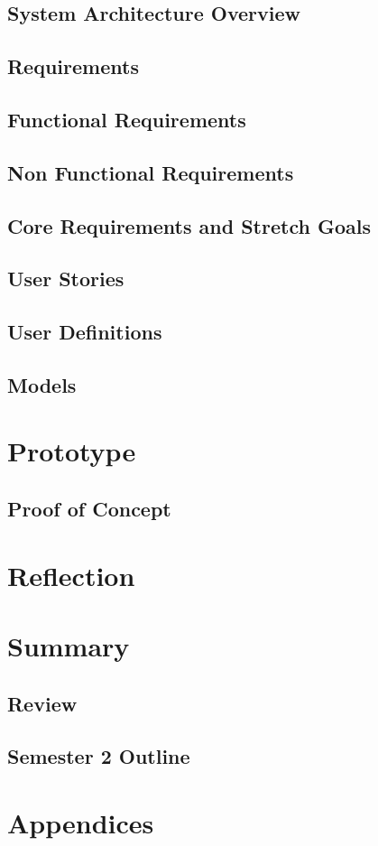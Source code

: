 \documentclass{article}
\begin{document}
\subsection{System Architecture Overview}
\subsection{Requirements}
\subsection{Functional Requirements}
\subsection{Non Functional Requirements}
\subsection{Core Requirements and Stretch Goals}
\subsection{User Stories}
\subsection{User Definitions}
\subsection{Models}
\section{Prototype}
\subsection{Proof of Concept}
\section{Reflection}
\section{Summary}
\subsection{Review}
\subsection{Semester 2 Outline}
\section{Appendices}



\end{document}
